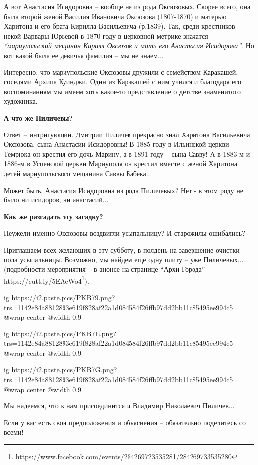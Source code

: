 А вот Анастасия Исидоровна – вообще не из рода Оксюзовых. Скорее всего, она
была второй женой Василия Ивановича Оксюзова (1807-1870) и матерью Харитона и
его брата Кирилла Васильевича (р.1839). Так, среди крестников некой Варвары
Юрьевой в 1870 году в церковной метрике значатся – \emph{\enquote{мариупольский мещанин
Кирилл Оксюзов и мать его Анастасия Исидорова}}. Но вот какой была ее девичья
фамилия – мы не знаем...

Интересно, что мариупольские Оксюзовы дружили с семейством Каракашей, соседями
Архипа Куинджи. Один из Каракашей с ним учился и благодаря его воспоминаниям мы
имеем хоть какое-то представление о детстве знаменитого художника.

\textbf{А что же Пиличевы?}

Ответ – интригующий. Дмитрий Пиличев прекрасно знал Харитона Васильевича
Оксюзова, сына Анастасии Исидоровны! В 1885 году в Ильинской церкви Темрюка он
крестил его дочь Марину, а в 1891 году – сына Савву! А в 1883-м и 1886-м в
Успенской церкви Мариуполя он крестил вместе с женой Харитона детей
мариупольского мещанина Саввы Бабека...

Может быть, Анастасия Исидоровна из рода Пиличевых? Нет - в этом роду не было
ни исидоров, ни анастасий...

\textbf{Как же разгадать эту загадку?}

Неужели именно Оксюзовы воздвигли усыпальницу? И старожилы ошибались?

Приглашаем всех желающих в эту субботу, в полдень на завершение очистки пола
усыпальницы. Возможно, мы найдем еще одну плиту – уже Пиличевых... (подробности
мероприятия – в анонсе на странице \enquote{Архи-Города} \url{https://cutt.ly/5EAcWo4}\footnote{\url{https://www.facebook.com/events/284269723535281/284269733535280}}).

\ifcmt
  ig https://i2.paste.pics/PKB79.png?trs=1142e84a8812893e619f828af22a1d084584f26ffb97dd2bb11c85495ee994c5
  @wrap center
  @width 0.9
\fi

\ifcmt
  ig https://i2.paste.pics/PKB7E.png?trs=1142e84a8812893e619f828af22a1d084584f26ffb97dd2bb11c85495ee994c5
  @wrap center
  @width 0.9
\fi

\ifcmt
  ig https://i2.paste.pics/PKB7G.png?trs=1142e84a8812893e619f828af22a1d084584f26ffb97dd2bb11c85495ee994c5
  @wrap center
  @width 0.9
\fi

Мы надеемся, что к нам присоединится и Владимир Николаевич Пиличев...

Если у вас есть свои предположения и объяснения – обязательно поделитесь со
всеми!

